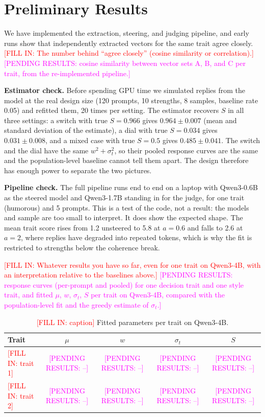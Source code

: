 \documentclass[11pt]{article}
\newcommand{\fillin}[1]{\textcolor{red}{[FILL IN: #1]}}
\newcommand{\upd}[1]{{\color{updgreen}#1}}
\newcommand{\pending}[1]{\textcolor{magenta}{[PENDING RESULTS: #1]}}
\begin{document}
\section{Preliminary Results}

We have implemented the extraction, steering, and judging pipeline, and early runs
show that independently extracted vectors for the same trait agree closely.
\fillin{The number behind ``agree closely'' (cosine similarity or correlation).}
\pending{cosine similarity between vector sets A, B, and C per trait, from the
re-implemented pipeline.}

\upd{\textbf{Estimator check.} Before spending GPU time we simulated replies from
the model at the real design size (120 prompts, 10 strengths, 8 samples, baseline
rate 0.05) and refitted them, 20 times per setting. The estimator recovers $S$ in
all three settings: a switch with true $S = 0.966$ gives $0.964 \pm 0.007$ (mean
and standard deviation of the estimate), a dial with true $S = 0.034$ gives
$0.031 \pm 0.008$, and a mixed case with true $S = 0.5$ gives $0.485 \pm 0.041$.
The switch and the dial have the same $w^2 + \sigma_t^2$, so their pooled response
curves are the same and the population-level baseline cannot tell them apart.
The design therefore has enough power to separate the two pictures.

\textbf{Pipeline check.} The full pipeline runs end to end on a laptop with
Qwen3-0.6B as the steered model and Qwen3-1.7B standing in for the judge, for
one trait (humorous) and 5 prompts. This is a test of the code, not a result:
the models and sample are too small to interpret. It does show the expected
shape. The mean trait score rises from 1.2 unsteered to 5.8 at $a = 0.6$ and
falls to 2.6 at $a = 2$, where replies have degraded into repeated tokens, which
is why the fit is restricted to strengths below the coherence break.}

\fillin{Whatever results you have so far, even for one trait on Qwen3-4B, with an
interpretation relative to the baselines above.}
\pending{response curves (per-prompt and pooled) for one decision trait and one
style trait, and fitted $\mu$, $w$, $\sigma_t$, $S$ per trait on Qwen3-4B,
compared with the population-level fit and the greedy estimate of $\sigma_t$.}

\begin{table}[t]
\centering
\begin{tabular}{lcccc}
\toprule
Trait & $\mu$ & $w$ & $\sigma_t$ & $S$ \\
\midrule
\fillin{trait 1} & \pending{--} & \pending{--} & \pending{--} & \pending{--} \\
\fillin{trait 2} & \pending{--} & \pending{--} & \pending{--} & \pending{--} \\
\bottomrule
\end{tabular}
\caption{\fillin{caption} Fitted parameters per trait on Qwen3-4B.}
\label{tab:results}
\end{table}
\end{document}
